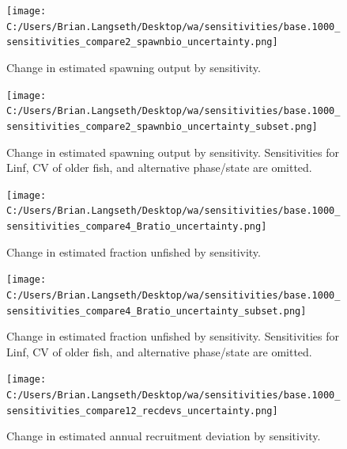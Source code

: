 \documentclass[11pt,
  english,
  letterpaper,
]{article}
\begin{document}

\begin{figure}
\centering
\texttt{[image: C:/Users/Brian.Langseth/Desktop/wa/sensitivities/base.1000\_sensitivities\_compare2\_spawnbio\_uncertainty.png]}
\caption{Change in estimated spawning output by sensitivity.\label{fig:sens-ssb}}
\end{figure}

\tagmcend\tagstructend


\begin{figure}
\centering
\texttt{[image: C:/Users/Brian.Langseth/Desktop/wa/sensitivities/base.1000\_sensitivities\_compare2\_spawnbio\_uncertainty\_subset.png]}
\caption{Change in estimated spawning output by sensitivity. Sensitivities for Linf, CV of older fish, and alternative phase/state are omitted.\label{fig:sens-ssb-subset}}
\end{figure}

\tagmcend\tagstructend


\begin{figure}
\centering
\texttt{[image: C:/Users/Brian.Langseth/Desktop/wa/sensitivities/base.1000\_sensitivities\_compare4\_Bratio\_uncertainty.png]}
\caption{Change in estimated fraction unfished by sensitivity.\label{fig:sens-depl}}
\end{figure}

\tagmcend\tagstructend


\begin{figure}
\centering
\texttt{[image: C:/Users/Brian.Langseth/Desktop/wa/sensitivities/base.1000\_sensitivities\_compare4\_Bratio\_uncertainty\_subset.png]}
\caption{Change in estimated fraction unfished by sensitivity. Sensitivities for Linf, CV of older fish, and alternative phase/state are omitted.\label{fig:sens-depl-subset}}
\end{figure}

\tagmcend\tagstructend


\begin{figure}
\centering
\texttt{[image: C:/Users/Brian.Langseth/Desktop/wa/sensitivities/base.1000\_sensitivities\_compare12\_recdevs\_uncertainty.png]}
\caption{Change in estimated annual recruitment deviation by sensitivity.\label{fig:sens-recdev}}
\end{figure}
\end{document}
